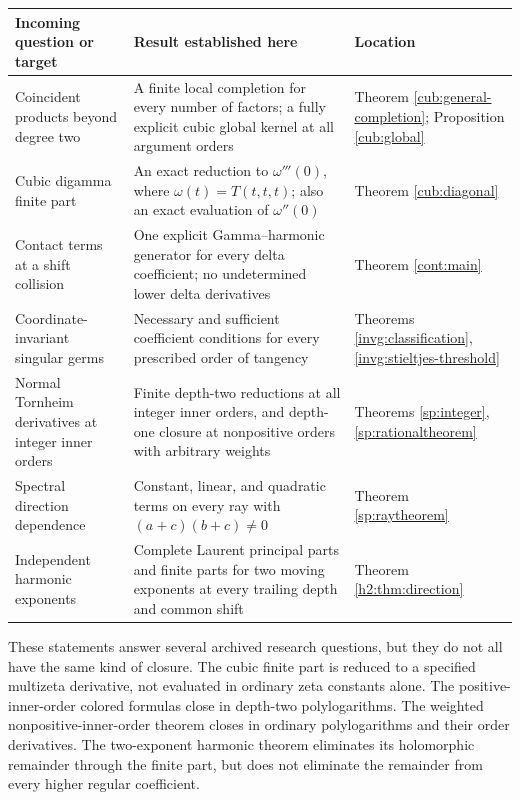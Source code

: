 \begin{longtable}{@{}>{\raggedright\arraybackslash}p{}
 >{\raggedright\arraybackslash}p{}
 >{\raggedright\arraybackslash}p{}@{}}
\toprule
Incoming question or target & Result established here & Location\\
\midrule
\endhead
Coincident products beyond degree two &
A finite local completion for every number of factors; a fully
explicit cubic global kernel at all argument orders &
Theorem \ref{cub:general-completion};
Proposition \ref{cub:global}\\[3pt]
Cubic digamma finite part &
An exact reduction to $\omega'''(0)$, where
$\omega(t)=T(t,t,t)$; also an exact evaluation of $\omega''(0)$ &
Theorem \ref{cub:diagonal}\\[3pt]
Contact terms at a shift collision &
One explicit Gamma--harmonic generator for every delta coefficient;
no undetermined lower delta derivatives &
Theorem \ref{cont:main}\\[3pt]
Coordinate-invariant singular germs &
Necessary and sufficient coefficient conditions for every prescribed
order of tangency &
Theorems \ref{invg:classification},
\ref{invg:stieltjes-threshold}\\[3pt]
Normal Tornheim derivatives at integer inner orders &
Finite depth-two reductions at all integer inner orders, and
depth-one closure at nonpositive orders with arbitrary weights &
Theorems \ref{sp:integer}, \ref{sp:rationaltheorem}\\[3pt]
Spectral direction dependence &
Constant, linear, and quadratic terms on every ray with
$(a+c)(b+c)\ne0$ &
Theorem \ref{sp:raytheorem}\\[3pt]
Independent harmonic exponents &
Complete Laurent principal parts and finite parts for two moving
exponents at every trailing depth and common shift &
Theorem \ref{h2:thm:direction}\\
\bottomrule
\end{longtable}

These statements answer several archived research questions, but they
do not all have the same kind of closure. The cubic finite part is
reduced to a specified multizeta derivative, not evaluated in ordinary
zeta constants alone. The positive-inner-order colored formulas close
in depth-two polylogarithms. The weighted nonpositive-inner-order
theorem closes in ordinary polylogarithms and their order derivatives.
The two-exponent harmonic theorem eliminates its holomorphic
remainder through the finite part, but does not eliminate the
remainder from every higher regular coefficient.


